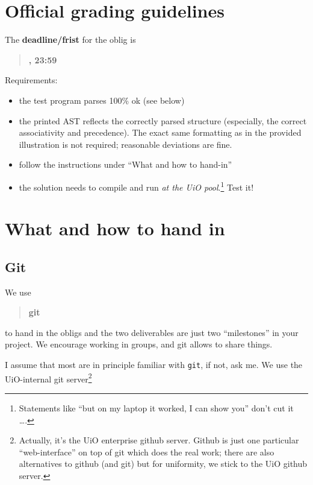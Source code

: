 \documentclass[10pt,freeform]{handout}[2014/08/13]
\begin{document}
\thispagestyle{empty}

\section{Official grading guidelines}
\label{sec:official-info}




\hrulefill{}

The \textbf{deadline/frist}  for the oblig is

\begin{quote}
  \textbf{\deadlineone, 23:59} %
\end{quote}

Requirements:


\begin{itemize}
\item the test program parses 100\% ok (see below)
\item the printed AST reflects the correctly parsed structure (especially,
  the correct associativity and precedence). The exact same formatting as
  in the provided illustration is not required; reasonable deviations are
  fine.
\item follow the instructions under ``What and how to  hand-in''
\item the solution needs to compile and run \emph{at the UiO
    pool}.\footnote{Statements like ``but on my laptop it worked, I can show
    you'' don't cut it \ldots.} Test it!
\end{itemize}

\hrulefill




\section{What and how to hand in}
\label{sec:what-how}


\subsection{Git}
\label{sec:git}



We use
\begin{quote}
  \textbf{git}   
\end{quote}
to hand in the obligs and the two deliverables are just two ``milestones''
in your project. We encourage working in groups, and git allows to share
things.

I assume that most are in principle familiar with \texttt{git}, if not, ask
me.  We use the UiO-internal git server\footnote{Actually, it's the UiO
  enterprise github server. Github is just one particular ``web-interface''
  on top of git which does the real work; there are also alternatives to
  github (and git) but for uniformity, we stick to the UiO github server.}
\end{document}
